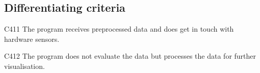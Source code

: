 	
\subsection{Differentiating criteria}
	
	\begin{aims}
		
		\item[C411] The program receives preprocessed data and does get in touch with hardware sensors.
		\item[C412] The program does not evaluate the data but processes the data for further visualisation. %
	
	\end{aims}
	



	
